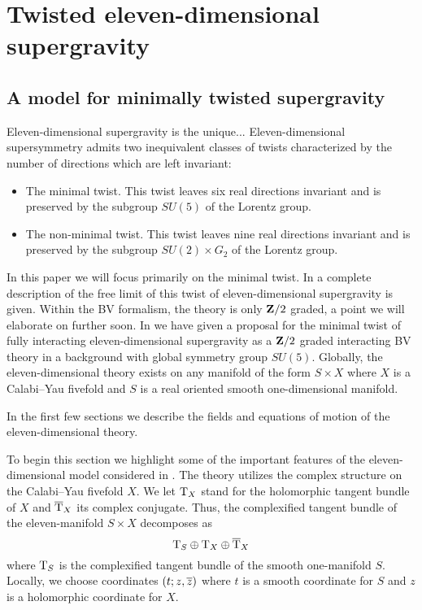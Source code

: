 \documentclass[11pt]{amsart}%
\begin{document}
\section{Twisted eleven-dimensional supergravity}
%
\subsection{A model for minimally twisted supergravity}

Eleven-dimensional supergravity is the unique...
Eleven-dimensional supersymmetry admits two inequivalent classes of twists characterized by the number of directions which are left invariant:
\begin{itemize}
\item 
The minimal twist. 
This twist leaves six real directions invariant and is preserved by the subgroup $SU(5)$ of the Lorentz group. 
\item 
The non-minimal twist. 
This twist leaves nine real directions invariant and is preserved by the subgroup $SU(2) \times G_2$ of the Lorentz group. 
\end{itemize}

In this paper we will focus primarily on the minimal twist. 
In \cite{SWspinor} a complete description of the free limit of this twist of eleven-dimensional supergravity is given.
Within the BV formalism, the theory is only $\mathbf{Z}/2$ graded, a point we will elaborate on further soon. 
In \cite{RSW} we have given a proposal for the minimal twist of fully interacting eleven-dimensional supergravity as a $\mathbf{Z}/2$ graded interacting BV theory in a background with global symmetry group $SU(5)$.
Globally, the eleven-dimensional theory exists on any manifold of the form $S \times X$ where $X$ is a Calabi--Yau fivefold and $S$ is a real oriented smooth one-dimensional manifold.

In the first few sections we describe the fields and equations of motion of the eleven-dimensional theory. 

%

\parsec[s:sugrafields]

To begin this section we highlight some of the important features of the eleven-dimensional model considered in \cite{RSW}. 
The theory utilizes the complex structure on the Calabi--Yau fivefold $X$.
We let ${\rm T}_X$ stand for the holomorphic tangent bundle of $X$ and $\overline{{\rm T}}_X$ its complex conjugate.
Thus, the complexified tangent bundle of the eleven-manifold $S \times X$ decomposes as
\[
{\rm T}_S \oplus {\rm T}_X \oplus \overline{{\rm T}}_X 
\]
where ${\rm T}_S$ is the complexified tangent bundle of the smooth one-manifold $S$.
Locally, we choose coordinates $(t;z,\overline{z})$ where $t$ is a smooth coordinate for $S$ and $z$ is a holomorphic coordinate for $X$. 
\end{document}
